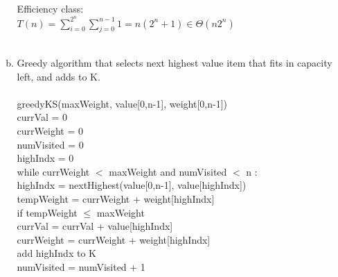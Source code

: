 \documentclass[11pt]{article}
\begin{document}
\begin{enumerate}
\begin{enumerate}[(a)]
				Efficiency class: \\
					\hspace*{.4cm}
					$ T(n) = \sum_{i=0}^{2^n} \sum_{j=0}^{n-1} 1 = n(2^n+1) \in \Theta(n2^n) $ \\\\
			\item Greedy algorithm that selects next highest value item that fits in capacity left, and adds to K. \\\\
				greedyKS(maxWeight, value[0,n-1], weight[0,n-1]) \\
					\hspace*{.4cm}
					currVal = 0 \\
					\hspace*{.4cm}
					currWeight = 0 \\
					\hspace*{.4cm}
					numVisited = 0 \\
					\hspace*{.4cm}
					highIndx = 0 \\
					\hspace*{.4cm}
					while currWeight $ < $ maxWeight and numVisited $ < $ n : \\
						\hspace*{.8cm}
						highIndx = nextHighest(value[0,n-1], value[highIndx]) \\
						\hspace*{.8cm}
						tempWeight = currWeight + weight[highIndx] \\
						\hspace*{.8cm}
						if tempWeight $ \leq $ maxWeight \\
							\hspace*{1.2cm}
							currVal = currVal + value[highIndx] \\
							\hspace*{1.2cm}
							currWeight = currWeight + weight[highIndx] \\
							\hspace*{1.2cm}
							add highIndx to K \\
						\hspace*{.8cm}
						numVisited = numVisited + 1 \\
						
				

\end{enumerate}
\end{enumerate}
\end{document}
